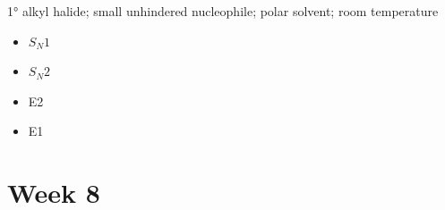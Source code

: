 \documentclass[12pt,a4paper]{article}
\begin{document}
\begin{enumerate}
{    \ang{1} alkyl halide; small unhindered nucleophile; polar solvent; room temperature
        \begin{itemize}
            \item \(S_N1\)
            \item {\color{o-Sun}\(S_N2\)}
            \item E2
            \item E1
        \end{itemize}
    }
\end{enumerate}

\section*{Week 8}
{}

\end{document}
